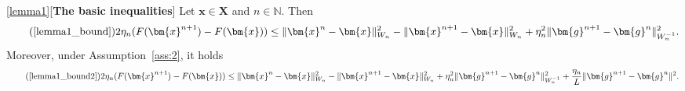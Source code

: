 \documentclass[11pt]{article}
\theoremstyle{plain}
\theoremstyle{definition}
\theoremstyle{remark}
\newcommand{\norm}[1]{\lVert{#1}\rVert}
\newcommand{\bHH}{\bm{X}}
\newcommand{\bx}{\bm{x}}
\newcommand{\buu}{\bm{g}}
\newcommand{\iter}{n}
\newcommand{\N}{\mathbb{N}}
\newcommand{\W}{W}
\begin{document}
\begin{customlem}{\ref{lemma1}}[\textbf{The basic inequalities}]
Let $\bx\in \bHH$ and $\iter \in \N$. Then
\begin{equation}%
\tag{\ref{lemma1_bound}}    2\eta_\iter(F(\bx^{\iter+1}) - F(\bx))  
    \le \norm{\bx^\iter - \bx}_{\W_\iter}^2- \norm{\bx^{\iter+1} - \bx}_{\W_\iter}^2+ \eta_\iter^2 \norm{\buu^{\iter+1} - \buu^{\iter}}_{\W_\iter^{-1}}^2.
    \end{equation}
Moreover, under Assumption~\ref{ass:2}, it holds
\begin{equation}%
\tag{\ref{lemma1_bound2}}    2\eta_\iter(F(\bx^{\iter+1}) - F(\bx))  
    \le \norm{\bx^\iter - \bx}_{\W_\iter}^2- \norm{\bx^{\iter+1} - \bx}_{\W_\iter}^2 + \eta_\iter^2 \norm{\buu^{\iter+1} - \buu^{\iter}}_{\W_\iter^{-1}}^2 + \frac{\eta_\iter}{L}\norm{\buu^{\iter+1} - \buu^{\iter}}^2.
    \end{equation}
\end{customlem}
\end{document}

